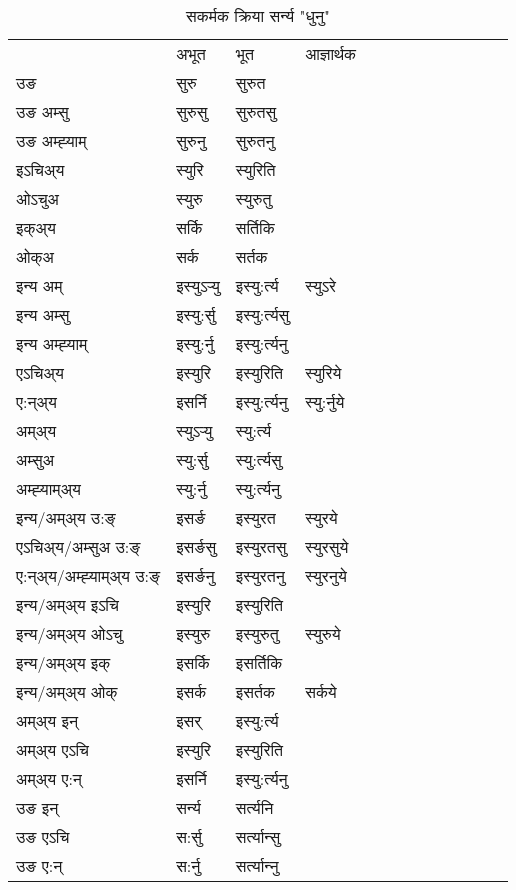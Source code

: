 \begin{table}[H]
\centering
\caption{\label{ur.vt} सकर्मक क्रिया  सर्न्य  "धुनु"  }
\begin{tabular}{l|l|l|l|l|l|l|l|l|l|l|l|l}  \toprule
&अभूत & भूत & आज्ञार्थक \\ 
उङ &सुरु &सुरुत \\ 
उङ अम्सु &सुरुसु &सुरुतसु \\ 
उङ अम्ह्‍याम् &सुरुनु &सुरुतनु \\ 
इऽचिअ्य &स्युरि &स्युरिति   \\ 
ओऽचुअ &स्युरु &स्युरुतु   \\ 
इक्अ्य &सर्कि &सर्तिकि   \\ 
ओक्अ &सर्क &सर्तक   \\ 
इन्य अम् & इस्युऽर्‍यु  & इस्यु:र्त्य &स्युऽरे  \\ 
इन्य अम्सु & इस्यु:र्सु  & इस्यु:र्त्यसु   \\ 
इन्य अम्ह्‍याम् & इस्यु:र्नु  & इस्यु:र्त्यनु   \\ 
एऽचिअ्य & इस्युरि & इस्युरिति &स्युरिये    \\ 
ए:न्अ्य & इसर्नि  & इस्यु:र्त्यनु &स्यु:र्नुये  \\ 
अम्अ्य & स्युऽर्‍यु  & स्यु:र्त्य  \\ 
अम्सुअ & स्यु:र्सु & स्यु:र्त्यसु  \\ 
अम्ह्‍याम्अ्य & स्यु:र्नु  & स्यु:र्त्यनु \\ 
\midrule
इन्य/अम्अ्य उ:ङ्‌&इसर्ङ & इस्युरत &स्युरये \\ 
एऽचिअ्य/अम्सुअ उ:ङ्‌ &इसर्ङसु & इस्युरतसु &स्युरसुये \\ 
ए:न्अ्य/अम्ह्‍याम्अ्य उ:ङ्‌ &इसर्ङनु & इस्युरतनु &स्युरनुये \\ 
इन्य/अम्अ्य इऽचि & इस्युरि & इस्युरिति    \\ 
इन्य/अम्अ्य ओऽचु & इस्युरु & इस्युरुतु  &स्युरुये  \\ 
इन्य/अम्अ्य इक् & इसर्कि & इसर्तिकि   \\ 
इन्य/अम्अ्य ओक् & इसर्क & इसर्तक  &सर्कये  \\ 
अम्अ्य इन् & इसर् & इस्यु:र्त्य   \\ 
अम्अ्य एऽचि & इस्युरि & इस्युरिति    \\ 
अम्अ्य ए:न् & इसर्नि  & इस्यु:र्त्यनु  \\ 
\midrule
उङ इन् & सर्न्य  & सर्त्यनि  \\ 
उङ एऽचि & स:र्सु  & सर्त्यान्सु   \\ 
उङ ए:न्& स:र्नु  & सर्त्यान्‍नु   \\ 
\bottomrule
\end{tabular}
\end{table}


